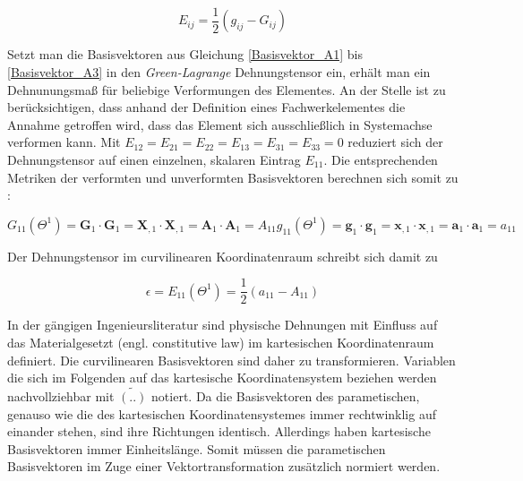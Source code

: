 \documentclass[german,a4paper,12pt,oneside]{scrbook}
\theoremstyle{definition}
\theoremstyle{definition}
\theoremstyle{definition}
\theoremstyle{definition}
\theoremstyle{definition}
\theoremstyle{definition}
\begin{document}
\begin{equation}
    E_{ij} = \frac{1}{2} (g_{ij} - G_{ij} )
\end{equation}

\vspace{0.5cm}
Setzt man die Basisvektoren aus Gleichung \eqref{Basisvektor_A1} bis \eqref{Basisvektor_A3} in den \emph{Green-Lagrange} Dehnungstensor ein, erhält man ein Dehnunungsmaß für beliebige Verformungen des Elementes. An der Stelle ist zu berücksichtigen, dass anhand der Definition eines Fachwerkelementes die Annahme getroffen wird, dass das Element sich ausschließlich in Systemachse verformen kann. Mit $E_{12} = E_{21} = E_{22} = E_{13} = E_{31} = E_{33} = 0$ reduziert sich der Dehnungstensor auf einen einzelnen, skalaren Eintrag $E_{11}$. Die entsprechenden Metriken der verformten und unverformten Basisvektoren berechnen sich somit zu :

\begin{subequations}
    \begin{equation}
        G_{11}(\Theta^1) = \bm{G}_1 \cdot \bm{G}_1 = \bm{X}_{,1} \cdot \bm{X}_{,1} = \bm{A}_1 \cdot \bm{A}_1 = A_{11}    
    \end{equation}
    \begin{equation}
        g_{11}(\Theta^1) = \bm{g}_1 \cdot \bm{g}_1 = \bm{x}_{,1} \cdot \bm{x}_{,1} = \bm{a}_1 \cdot \bm{a}_1 = a_{11}  
    \end{equation}
\end{subequations}

\vspace{0.5cm}
Der Dehnungstensor im curvilinearen Koordinatenraum schreibt sich damit zu

\begin{equation} \label{E_11_parameter}
    \epsilon = E_{11}(\Theta^1) =  \frac{1}{2}(a_{11} - A_{11})
\end{equation}

\vspace{0.5cm}
In der gängigen Ingenieursliteratur sind physische Dehnungen mit Einfluss auf das Materialgesetzt (engl. constitutive law) im kartesischen Koordinatenraum definiert. Die curvilinearen Basisvektoren sind daher zu transformieren. Variablen die sich im Folgenden auf das kartesische Koordinatensystem beziehen werden nachvollziehbar mit $\tilde{( .. )}$ notiert. Da die Basisvektoren des parametischen, genauso wie die des kartesischen Koordinatensystemes immer rechtwinklig auf einander stehen, sind ihre Richtungen identisch. Allerdings haben kartesische Basisvektoren immer Einheitslänge. Somit müssen die parametischen Basisvektoren im Zuge einer Vektortransformation zusätzlich normiert werden. 
\end{document}
